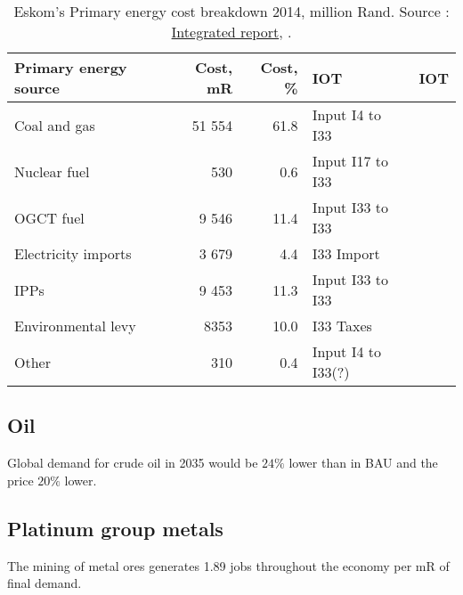 \documentclass[12pt,english]{article}
\begin{document}
\begin{table}[ht]
	\centering
	\begin{tabular}{lrrlr}
		\toprule
		Primary energy source	& Cost, mR  & Cost, \% & IOT  & IOT\\ 
		\midrule
		Coal and gas & 51 554   &  61.8   & Input I4 to I33 &\\
		Nuclear  fuel &  530  &   0.6  & Input I17 to I33& \\
		OGCT fuel & 9 546   &   11.4   & Input I33 to I33  & \\
		Electricity  imports & 3 679   &  4.4  & I33 Import & \\
		IPPs &  9 453  &  11.3  & Input I33 to I33 & \\
		Environmental levy & 8353 &   10.0   & I33 Taxes & \\
		Other &  310  &  0.4  & Input I4 to I33(?) 	& \\
		\bottomrule
	\end{tabular}
	\caption{\label{EskomPrimaryEnergy}Eskom's Primary energy cost breakdown 2014, million Rand. Source : \href{http://www.eskom.co.za/IR2015/Documents/EskomIR2015single.pdf}{Integrated report}, \citep{Eskom2014AR}.}
\end{table}




\subsection{Oil}

Global demand for crude oil in 2035 would be $24\%$ lower than in BAU and the price $20\%$ lower. 


\subsection{Platinum group metals}

The mining of metal ores generates 1.89 jobs throughout the economy per mR of final demand. 

\newpage


\clearpage
\end{document}
